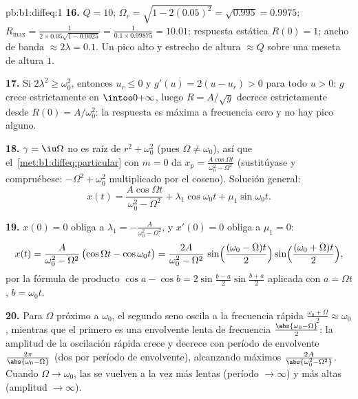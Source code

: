 \begin{solution}{pb:b1:diffeq:1}
\textbf{16.} $Q = 10$; $\Omega_r = \sqrt{1 - 2(0.05)^2} =
\sqrt{0.995} = 0.9975$; $R_{\max} = \frac1{2 \times 0.05
\sqrt{1 - 0.0025}} = \frac1{0.1 \times 0.99875} = 10.01$; respuesta
estática $R(0) = 1$; ancho de banda $\approx 2\lambda = 0.1$. Un pico
alto y estrecho de altura $\approx Q$ sobre una meseta de altura $1$.

\textbf{17.} Si $2\lambda^2 \geq \omega_0^2$, entonces $u_r \leq 0$ y
$g'(u) = 2(u - u_r) > 0$ para todo $u > 0$: $g$ crece estrictamente en
$\intoo0{+\infty}$, luego $R = A/\sqrt g$ decrece estrictamente desde
$R(0) = A/\omega_0^2$: la respuesta es máxima a frecuencia cero y no
hay pico alguno.

\textbf{18.} $\gamma = \iu\Omega$ no es raíz de $r^2 + \omega_0^2$
(pues $\Omega \neq \omega_0$), así que
el~\cref{met:b1:diffeq:particular} con $m = 0$ da
$x_p = \frac{A\cos\Omega t}{\omega_0^2 - \Omega^2}$ (sustitúyase y
compruébese: $-\Omega^2 + \omega_0^2$ multiplicado por el coseno).
Solución general:
\[
x(t) = \frac{A\cos\Omega t}{\omega_0^2 - \Omega^2}
+ \lambda_1\cos\omega_0 t + \mu_1\sin\omega_0 t .
\]

\textbf{19.} $x(0) = 0$ obliga a $\lambda_1 = -\frac A{\omega_0^2 -
\Omega^2}$, y $x'(0) = 0$ obliga a $\mu_1 = 0$:
\[
x(t) = \frac{A}{\omega_0^2 - \Omega^2}\,
\bigl(\cos\Omega t - \cos\omega_0 t\bigr)
= \frac{2A}{\omega_0^2 - \Omega^2}\,
\sin\Bigl(\frac{(\omega_0 - \Omega)t}2\Bigr)
\sin\Bigl(\frac{(\omega_0 + \Omega)t}2\Bigr) ,
\]
por la fórmula de producto $\cos a - \cos b =
2\sin\frac{b - a}2\sin\frac{b + a}2$ aplicada con $a = \Omega t$,
$b = \omega_0 t$.

\textbf{20.} Para $\Omega$ próximo a $\omega_0$, el segundo seno oscila
a la frecuencia rápida $\frac{\omega_0 + \Omega}2 \approx \omega_0$,
mientras que el primero es una envolvente lenta de frecuencia
$\frac{\abs{\omega_0 - \Omega}}2$: la amplitud de la oscilación rápida
crece y decrece con período de envolvente
$\frac{2\pi}{\abs{\omega_0 - \Omega}}$ (dos  por período de
envolvente), alcanzando máximos
$\frac{2A}{\abs{\omega_0^2 - \Omega^2}}$. Cuando $\Omega \to \omega_0$,
las  se vuelven a la vez más lentas (período $\to \infty$) y
más altas (amplitud $\to \infty$).


\end{solution}

